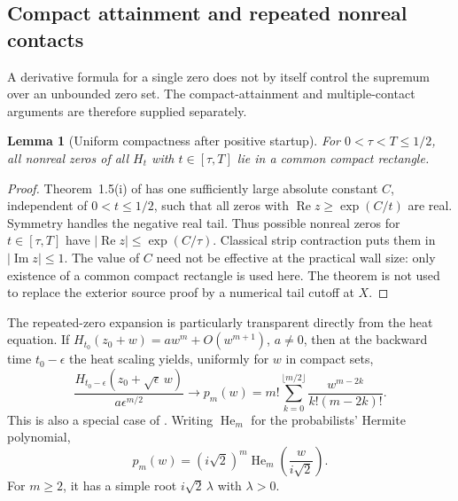\documentclass[11pt,a4paper]{article}
\newtheorem{lemma}[theorem]{Lemma}
\theoremstyle{definition}
\theoremstyle{remark}
\newcommand{\Ree}{\operatorname{Re}}
\newcommand{\Imm}{\operatorname{Im}}
\begin{document}
\subsection{Compact attainment and repeated nonreal contacts}
\label{fnd:globalcontact}

A derivative formula for a single zero does not by itself control the
supremum over an unbounded zero set. The compact-attainment and
multiple-contact arguments are therefore supplied separately.

\begin{lemma}[Uniform compactness after positive startup]
\label{fnd:compact}
For $0<\tau<T\leq1/2$, all nonreal zeros of all $H_t$ with
$t\in[\tau,T]$ lie in a common compact rectangle.
\end{lemma}
\begin{proof}
Theorem~1.5(i) of \cite{Polymath} has one sufficiently large absolute
constant $C$, independent of $0<t\leq1/2$, such that all zeros with
$\Ree z\geq\exp(C/t)$ are real. Symmetry handles the negative real tail.
Thus possible nonreal zeros for $t\in[\tau,T]$ have
$|\Ree z|\leq\exp(C/\tau)$. Classical strip contraction puts them in
$|\Imm z|\leq1$. The value of $C$ need not be effective at the practical
wall size: only existence of a common compact rectangle is used here.
The theorem is not used to replace the exterior source proof by a
numerical tail cutoff at $X$.
\end{proof}

The repeated-zero expansion is particularly transparent directly from
the heat equation. If $H_{t_0}(z_0+w)=a w^m+O(w^{m+1})$, $a\ne0$,
then at the backward time $t_0-\epsilon$ the heat scaling yields,
uniformly for $w$ in compact sets,
\begin{equation}
 \frac{H_{t_0-\epsilon}(z_0+\sqrt\epsilon\,w)}{a\epsilon^{m/2}}
 \longrightarrow
 p_m(w)=m!\sum_{k=0}^{\lfloor m/2\rfloor}
                   \frac{w^{m-2k}}{k!(m-2k)!}.
 \label{fnd:backwardpolynomial}
\end{equation}
This is also a special case of \cite[Proposition~3.1(ii)]{Polymath}.
Writing $\operatorname{He}_m$ for the probabilists' Hermite polynomial,
\begin{equation}
 p_m(w)=(i\sqrt2)^m\operatorname{He}_m\left(\frac{w}{i\sqrt2}\right).
 \label{fnd:hermite}
\end{equation}
For $m\geq2$, it has a simple root $i\sqrt2\,\lambda$ with
$\lambda>0$.
\end{document}
